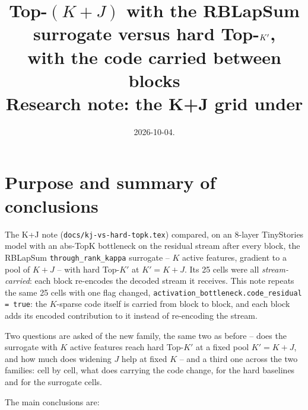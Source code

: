 \documentclass[11pt,a4paper]{article}
\title{Top-$(K{+}J)$ with the RBLapSum surrogate versus hard Top-$\Kp$,\\
with the code carried between blocks\\[2pt]
\large Research note: the K+J grid under \code{code\_residual}}
\author{}
\date{2026-10-04.}
\newcommand{\code}[1]{\texttt{#1}}
\newcommand{\Kp}{K'}
\begin{document}
\maketitle
\vspace{-2em}

\section{Purpose and summary of conclusions}

The K+J note (\code{docs/kj-vs-hard-topk.tex}) compared, on an 8-layer
TinyStories model with an abs-TopK bottleneck on the residual stream after
every block, the RBLapSum \code{through\_rank\_kappa} surrogate -- $K$ active
features, gradient to a pool of $K+J$ -- with hard Top-$\Kp$ at $\Kp = K+J$.
Its 25 cells were all \emph{stream-carried}: each block re-encodes the
decoded stream it receives. This note repeats the same 25 cells with one
flag changed, \code{activation\_bottleneck.code\_residual = true}: the
$K$-sparse code itself is carried from block to block, and each block adds
its encoded contribution to it instead of re-encoding the stream.

Two questions are asked of the new family, the same two as before -- does
the surrogate with $K$ active features reach hard Top-$\Kp$ at a fixed pool
$\Kp = K+J$, and how much does widening $J$ help at fixed $K$ -- and a third
one across the two families: cell by cell, what does carrying the code
change, for the hard baselines and for the surrogate cells.

The main conclusions are:
\end{document}
